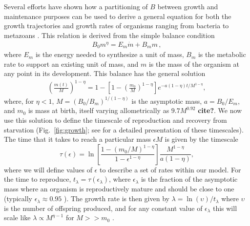 \documentclass{pnastwo}
\begin{document}
\begin{article}
Several efforts have shown how a partitioning of $B$ between growth and
maintenance purposes can be used to derive a general equation for both the
growth trajectories and growth rates of organisms ranging from bacteria to
metazoans
\cite{West:2001bv,moses2008rmo,gillooly2002esa,hou,Kempes:2012hy}. This relation is derived from the simple balance condition \cite{West:2001bv,moses2008rmo,gillooly2002esa,hou,Kempes:2012hy}
\begin{eqnarray}
\label{balance}
B_{0}m^{\eta}=E_{m}\dot{m}+B_{m}m\,,
\end{eqnarray}
where $E_{m}$ is the energy needed to synthesize a unit of mass, $B_{m}$ is
the metabolic rate to support an existing unit of mass, and $m$ is the mass
of the organism at any point in its development.  This balance has the
general solution \cite{bettencourt,Kempes:2012hy}
\begin{eqnarray}
\label{m1}
\left(\frac{m\left(t\right)}{M}\right)^{1-\eta}\!=1\!-\!\left[1\!-\!\left(\frac{m_{0}}{M}\right)^{1\!-\!\eta}\right]e^{-a\left(1\!-\!\eta\right)t/M^{1-\eta}},
\end{eqnarray}
where, for $\eta<1$, $M=(B_{0}/B_{m})^{1/(1-\eta)}$ is the asymptotic mass, $a=B_{0}/E_{m}$, and $m_0$ is mass at birth, itself varying allometrically as $9.7M^{0.92}$ {\bf cite?}.  We now use this solution to define the timescale of reproduction and recovery from starvation (Fig.~\ref{fig:growth}; see \cite{moses2008rmo} for a detailed presentation of these timescales). The time that it takes to reach a particular mass $\epsilon M$ is given by the timescale
\begin{equation}
\label{t1}
\tau\left(\epsilon\right) = \ln\left[\frac{1-\left(m_{0}/M\right)^{1-\eta}}{1-\epsilon^{1-\eta}}\right]\frac{M^{1-\eta}}{a\left(1-\eta\right)},
\end{equation}
where we will define values of $\epsilon$ to describe a set of rates within our model. For the time to reproduce, $t_{\lambda}=\tau\left(\epsilon_{\lambda}\right)$, where $\epsilon_{\lambda}$ is the fraction of the asymptotic mass where an organism is reproductively mature and should be close to one (typically $\epsilon_{\lambda}\approx0.95$ \cite{West:2001bv}). The growth rate is then given by $\lambda=\ln\left(\upsilon\right)/t_{\lambda}$ where $\upsilon$ is the number of offspring produced, and for any constant value of $\epsilon_{\lambda}$ this will scale like $\lambda\propto M^{\eta-1}$ for $M>>m_{0}$ \cite{West:2001bv,moses2008rmo,gillooly2002esa,hou,Kempes:2012hy}.



\end{article}
\end{document}
